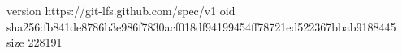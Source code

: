 version https://git-lfs.github.com/spec/v1
oid sha256:fb841de8786b3e986f7830acf018df94199454ff78721ed522367bbab9188445
size 228191
